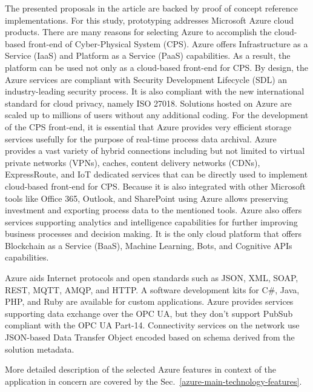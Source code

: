 \documentclass{article}
\begin{document}
The presented proposals in the article are backed by proof of concept reference implementations. For this study, prototyping addresses Microsoft Azure cloud products. There are many reasons for selecting Azure to accomplish the cloud-based front-end of Cyber-Physical System (CPS). Azure offers Infrastructure as a Service (IaaS) and Platform as a Service (PaaS) capabilities. As a result, the platform can be used not only as a cloud-based front-end for CPS. By design, the Azure services are compliant with Security Development Lifecycle (SDL) an industry-leading security process. It is also compliant with the new international standard for cloud privacy, namely ISO 27018. Solutions hosted on Azure are scaled up to millions of users without any additional coding. For the development of the CPS front-end, it is essential that Azure provides very efficient storage services usefully for the purpose of real-time process data archival. Azure provides a vast variety of hybrid connections including but not limited to virtual private networks (VPNs), caches, content delivery networks (CDNs), ExpressRoute, and IoT dedicated services that can be directly used to implement cloud-based front-end for CPS. Because it is also integrated with other Microsoft tools like Office 365, Outlook, and SharePoint using Azure allows preserving investment and exporting process data to the mentioned tools. Azure also offers services supporting analytics and intelligence capabilities for further improving business processes and decision making. It is the only cloud platform that offers Blockchain as a Service (BaaS), Machine Learning, Bots, and Cognitive APIs capabilities.

Azure aids Internet protocols and open standards such as JSON, XML, SOAP, REST, MQTT, AMQP, and HTTP. A software development kits for C\#, Java, PHP, and Ruby are available for custom applications. Azure provides services supporting data exchange over the OPC UA, but they don't support PubSub compliant with the OPC UA Part-14\cite{RefWorks:doc:5d98837de4b055984c0eecf0}. Connectivity services on the network use JSON-based Data Transfer Object encoded based on schema derived from the solution metadata.

More detailed description of the selected Azure features in context of the application in concern are covered by the Sec.~\ref*{azure-main-technology-features}.
\end{document}
